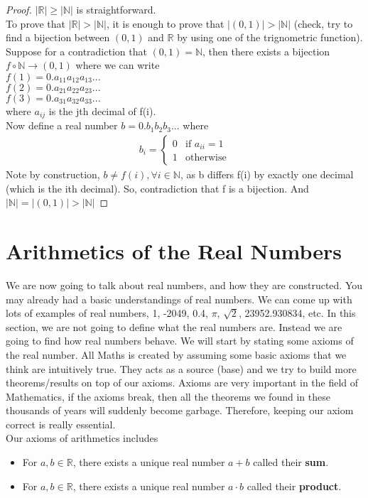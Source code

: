 \documentclass{book}
\begin{document}
\begin{proof}
    $|\mathbb{R}| \geq |\mathbb{N}|$ is straightforward. \\
    To prove that $|\mathbb{R}| > |\mathbb{N}|$, it is enough to prove that $|(0, 1)| > |\mathbb{N}|$ (check, try to find a bijection between $(0, 1)$ and $\mathbb{R}$ by using one of the trignometric function). \\
    Suppose for a contradiction that $(0, 1) = \mathbb{N}$, then there exists a bijection $f \circ \mathbb{N} \rightarrow (0, 1)$ where we can write \\
    \indent $f(1) = 0.a_{11}a_{12}a_{13}...$ \\
    \indent $f(2) = 0.a_{21}a_{22}a_{23}...$ \\
    \indent $f(3) = 0.a_{31}a_{32}a_{33}...$ \\
    where $a_{ij}$ is the jth decimal of f(i). \\
    Now define a real number $b = 0.b_{1}b_{2}b_{3}...$ where
    \begin{align*}
        b_{i} =
        \begin{cases}
            0 & \text{if } a_{ii} = 1 \\
            1 & \text{otherwise}
        \end{cases}
    \end{align*}
    Note by construction, $b \neq f(i), \forall i \in \mathbb{N}$, as b differs f(i) by exactly one decimal (which is the ith decimal). So, contradiction that f is a bijection. And $|\mathbb{N}| = |(0, 1)| > |\mathbb{N}|$
\end{proof}

\section{Arithmetics of the Real Numbers}
We are now going to talk about real numbers, and how they are constructed. You may already had a basic understandings of real numbers. We can come up with lots of examples of real numbers, 1, -2049, 0.4, $\pi$, $\sqrt{2}$, 23952.930834, etc. In this section, we are not going to define what the real numbers are. Instead we are going to find how real numbers behave. We will start by stating some axioms of the real number. All Maths is created by assuming some basic axioms that we think are intuitively true. They acts as a source (base) and we try to build more theorems/results on top of our axioms. Axioms are very important in the field of Mathematics, if the axioms break, then all the theorems we found in these thousands of years will suddenly become garbage. Therefore, keeping our axiom correct is really essential. \\
Our axioms of arithmetics includes
\begin{itemize}
    \item For $a, b \in \mathbb{R}$, there exists a unique real number $a + b$ called their \textbf{sum}.
    \item For $a, b \in \mathbb{R}$, there exists a unique real number $a \cdot b$ called their \textbf{product}.
\end{itemize}
\end{document}
